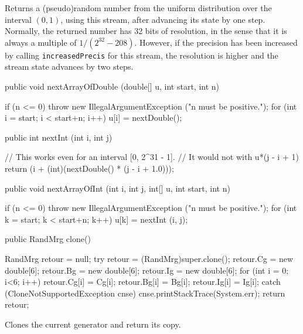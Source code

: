  \begin{tabb} Returns a (pseudo)random number from the uniform distribution
   over the interval $(0,1)$, using this stream,
   after advancing its state by one step.  
   Normally, the returned number has 32 bits of resolution,
   in the sense that it is always a multiple of $1/(2^{32}-208)$.
   However, if the precision has been increased by calling 
   \texttt{increasedPrecis} for this stream, the resolution is higher
   and the stream state advances by two steps.
 \end{tabb}
\begin{hide}
\begin{code}

   public void nextArrayOfDouble (double[] u, int start, int n)\begin{hide} {
      if (n <= 0)
         throw new IllegalArgumentException ("n must be positive.");
      for (int i = start; i < start+n; i++)
         u[i] = nextDouble();
   }\end{hide}

   public int nextInt (int i, int j) \begin{hide} {
      // This works even for an interval [0, 2^31 - 1].
      // It would not with u*(j - i + 1)
      return (i + (int)(nextDouble() * (j - i + 1.0)));
   }\end{hide}

   public void nextArrayOfInt (int i, int j, int[] u, int start, int n)\begin{hide} {
      if (n <= 0)
         throw new IllegalArgumentException ("n must be positive.");
      for (int k = start; k < start+n; k++)
         u[k] = nextInt (i, j);
   }\end{hide}
\end{code}
\end{hide}
\begin{code}

   public RandMrg clone() \begin{hide} {
      RandMrg retour = null;
      try {
         retour = (RandMrg)super.clone();
         retour.Cg = new double[6];
         retour.Bg = new double[6];
         retour.Ig = new double[6];
         for (int i = 0; i<6; i++) {
            retour.Cg[i] = Cg[i];
            retour.Bg[i] = Bg[i];
            retour.Ig[i] = Ig[i];
         }
      }
      catch (CloneNotSupportedException cnse) {
         cnse.printStackTrace(System.err);
      }
      return retour;
   }\end{hide}
\end{code}
 \begin{tabb} Clones the current generator and return its copy.
 \end{tabb}
 \begin{htmlonly}
\end{htmlonly}

\begin{code}\begin{hide}

}\end{hide}
\end{code}
